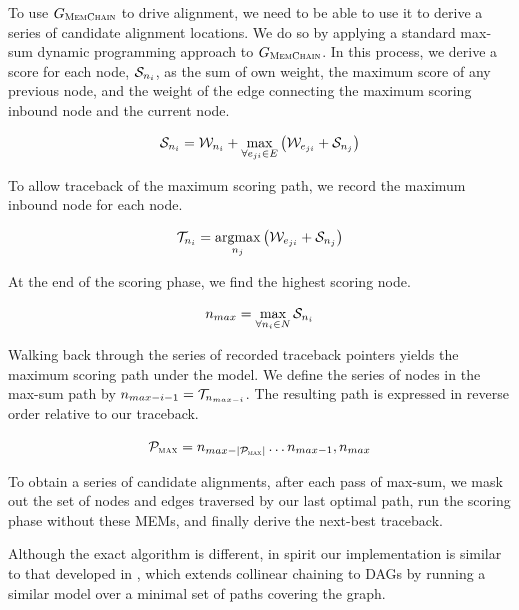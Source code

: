 To use $G_\textsc{MemChain}$ to drive alignment, we need to be able to use it to derive a series of candidate alignment locations.
We do so by applying a standard max-sum dynamic programming approach to $G_\textsc{MemChain}$.
In this process, we derive a score for each node, ${\cal S}_{n_i}$, as the sum of own weight, the maximum score of any previous node, and the weight of the edge connecting the maximum scoring inbound node and the current node.

\begin{equation}
  {\cal S}_{n_i} = {\cal W}_{n_i} + \max_{\forall e_{ji} \in E} \left( {\cal W}_{e_{ji}} + {\cal S}_{n_j} \right)
\end{equation}

To allow traceback of the maximum scoring path, we record the maximum inbound node for each node.

\begin{equation}
  {\cal T}_{n_i} = \operatorname*{argmax}_{n_j} \left( {\cal W}_{e_{ji}} + {\cal S}_{n_j} \right)
\end{equation}

At the end of the scoring phase, we find the highest scoring node.

\begin{equation}
  n_{max} = \max_{\forall n_i \in N} {\cal S}_{n_i}
\end{equation}

Walking back through the series of recorded traceback pointers yields the maximum scoring path under the model.
We define the series of nodes in the max-sum path by $n_{max-i-1} = {\cal T}_{n_{max-i}}$.
The resulting path is expressed in reverse order relative to our traceback.

\begin{equation}
  {\cal P}_\textsc{max} = n_{max-|{\cal P}_\textsc{max}|} \dots n_{max-1}, n_{max}
\end{equation}

To obtain a series of candidate alignments, after each pass of max-sum, we mask out the set of nodes and edges traversed by our last optimal path, run the scoring phase without these MEMs, and finally derive the next-best traceback.


Although the exact algorithm is different, in spirit our implementation is similar to that developed in \cite{kuosmanen2018using}, which extends collinear chaining to DAGs by running a similar model over a minimal set of paths covering the graph.


